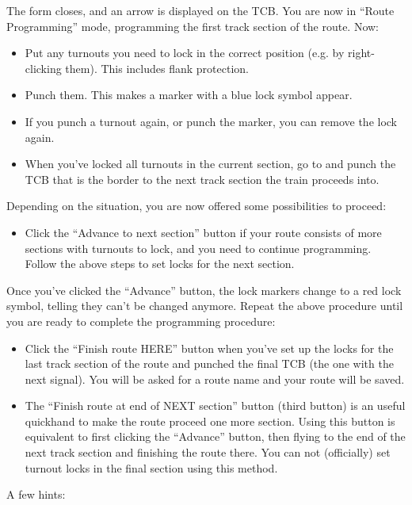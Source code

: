 \documentclass[english]{paper}
\begin{document}
The form closes, and an arrow is displayed on the TCB. You are now
in ``Route Programming'' mode, programming the first track section
of the route. Now:
\begin{itemize}
\item Put any turnouts you need to lock in the correct position (e.g. by
right-clicking them). This includes flank protection.
\item Punch them. This makes a marker with a blue lock symbol appear.
\item If you punch a turnout again, or punch the marker, you can remove
the lock again.
\item When you've locked all turnouts in the current section, go to and
punch the TCB that is the border to the next track section the train
proceeds into.
\end{itemize}
Depending on the situation, you are now offered some possibilities
to proceed:
\begin{itemize}
\item Click the ``Advance to next section'' button if your route consists
of more sections with turnouts to lock, and you need to continue programming.
Follow the above steps to set locks for the next section.
\end{itemize}
Once you've clicked the ``Advance'' button, the lock markers change
to a red lock symbol, telling they can't be changed anymore. Repeat
the above procedure until you are ready to complete the programming
procedure:
\begin{itemize}
\item Click the ``Finish route HERE'' button when you've set up the locks
for the last track section of the route and punched the final TCB
(the one with the next signal). You will be asked for a route name
and your route will be saved.
\item The ``Finish route at end of NEXT section'' button (third button)
is an useful quickhand to make the route proceed one more section.
Using this button is equivalent to first clicking the ``Advance''
button, then flying to the end of the next track section and finishing
the route there. You can not (officially) set turnout locks in the
final section using this method.
\end{itemize}
A few hints:
\end{document}
